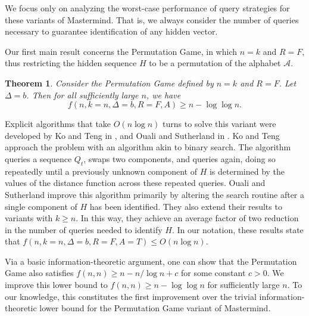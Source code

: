 \documentclass[12pt, a4paper]{article}
\newtheorem{theorem}{Theorem}
\begin{document}
We focus only on analyzing the worst-case performance of query strategies for these variants of Mastermind. That is, we always consider the number of queries necessary to guarantee identification of any hidden vector.

Our first main result concerns the Permutation Game, in which $n=k$ and $R=F$, thus restricting the hidden sequence $H$ to be a permutation of the alphabet $\mathcal{A}$.
\begin{theorem}\label{permutationGameTheorem}
	 Consider the Permutation Game defined by $n = k$ and $R = F$. Let $\Delta = b$. Then for all sufficiently large $n$, we have	
 	\begin{equation*}
		f(n, k = n, \Delta = b, R = F, A) \ge n - \log\log n.
	\end{equation*}
\end{theorem}

Explicit algorithms that take $O(n \log n)$ turns to solve this variant were developed by Ko and Teng in \cite{KT86}, and Ouali and Sutherland in \cite{OS13}. Ko and Teng approach the problem with an algorithm akin to binary search. The algorithm queries a sequence $Q_t$, swaps two components, and queries again, doing so repeatedly until a previously unknown component of $H$ is determined by the values of the distance function across these repeated queries. Ouali and Sutherland improve this algorithm primarily by altering the search routine after a single component of $H$ has been identified. They also extend their results to variants with $k\ge n$. In this way, they achieve an average factor of two reduction in the number of queries needed to identify $H$. In our notation, these results state that $f(n, k=n, \Delta=b, R = F, A = T)\le O(n\log n)$.

Via a basic information-theoretic argument, one can show that the Permutation Game also satisfies $f(n, n)\ge n - n/\log n + c$ for some constant $c>0$. We improve this lower bound to $f(n, n)\ge n- \log \log n$ for sufficiently large $n$. To our knowledge, this constitutes the first improvement over the trivial information-theoretic lower bound for the Permutation Game variant of Mastermind.
\end{document}
